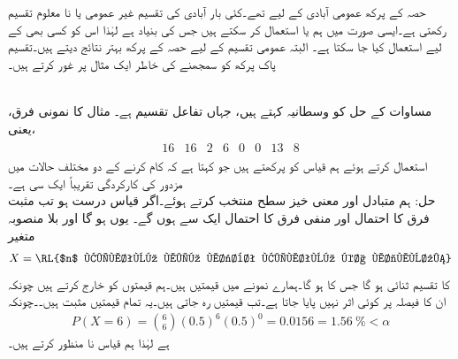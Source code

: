 حصہ  کے پرکھ عمومی آبادی کے لیے تھے۔کئی بار آبادی کی تقسیم غیر عمومی یا نا معلوم تقسیم رکھتی ہے۔ایسی صورت  میں ہم  یا  استعمال کر سکتے ہیں جس کی بنیاد   ہے لہٰذا اس کو کسی بھی  کے لیے استعمال کیا جا سکتا ہے۔ البتہ عمومی تقسیم کے لیے حصہ 
 کے پرکھ بہتر نتائج دیتے ہیں۔تقسیم پاک پرکھ کو سمجھنے کی خاطر ایک مثال پر غور کرتے ہیں۔

\quad {}\\
مساوات  کے حل  کو وسطانیہ کہتے ہیں، جہاں  تفاعل تقسیم ہے۔ مثال  کا نمونی فرق، یعنی،
\begin{align*}
\begin{array}{cccccccc}
16&16&2&6&0&0&13&8
\end{array}
\end{align*}
استعمال کرتے ہوئے ہم قیاس  کو پرکھتے ہیں جو کہتا ہے کہ   کام کرنے کے دو مختلف حالات میں مزدور کی کارکردگی تقریباً ایک سی  ہے۔\\
حل:\quad
ہم متبادل  اور معنی خیز سطح  منتخب کرتے ہوئے۔اگر قیاس درست ہو تب مثبت فرق کا احتمال  اور منفی فرق کا احتمال ایک سے ہوں گے۔ یوں  ہو گا اور بلا منصوبہ متغیر
\begin{align*}
X=\text{\RL{$n$ قیمتوں میں مثبت قیمتوں کا مجموعہ}}
\end{align*}
کا تقسیم ثنائی ہو گا جس کا  ہو گا۔ہمارے نمونے میں  قیمتیں ہیں۔ہم  قیمتوں کو خارج کرتے ہیں چونکہ ان کا فیصلہ پر کوئی اثر نہیں پایا جاتا ہے۔تب  قیمتیں رہ جاتی ہیں۔یہ تمام قیمتیں مثبت ہیں۔۔چونکہ
\begin{align*}
P(X=6)=\binom{6}{6} (0.5)^6(0.5)^0=0.0156=\SI{1.56}{\percent}<\alpha
\end{align*}
ہے لہٰذا ہم قیاس نا منظور کرتے ہیں۔


